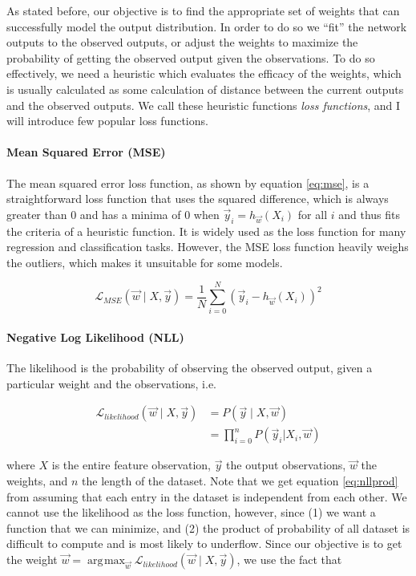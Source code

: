 \documentclass[12pt,a4paper,]{report}
\DeclareMathOperator*{\argmax}{arg\!\max}
\begin{document}
As stated before, our objective is to find the appropriate set of
weights that can successfully model the output distribution. In order to
do so we ``fit'' the network outputs to the observed outputs, or adjust
the weights to maximize the probability of getting the observed output
given the observations. To do so effectively, we need a heuristic which
evaluates the efficacy of the weights, which is usually calculated as
some calculation of distance between the current outputs and the
observed outputs. We call these heuristic functions \emph{loss
functions}, and I will introduce few popular loss functions.

\paragraph{Mean Squared Error (MSE)}

The mean squared error loss function, as shown by equation \ref{eq:mse},
is a straightforward loss function that uses the squared difference,
which is always greater than 0 and has a minima of 0 when
\(\vec{y}_i = h_{\vec{w}}(X_i)\) for all \(i\) and thus fits the
criteria of a heuristic function. It is widely used as the loss function
for many regression and classification tasks. However, the MSE loss
function heavily weighs the outliers, which makes it unsuitable for some
models.

\begin{equation}
    \mathcal{L}_{MSE}(\vec{w} \mid X, \vec{y}) = \frac{1}{N} \sum_{i = 0}^{N} (\vec{y}_i - h_{\vec{w}}(X_i))^2 \label{eq:mse}
\end{equation}

\paragraph{Negative Log Likelihood (NLL)}

The likelihood is the probability of observing the observed output,
given a particular weight and the observations, i.e.

\begin{align}
    \mathcal{L}_{likelihood}(\vec{w} \mid X, \vec{y}) &= P(\vec{y} \mid X, \vec{w}) \\
    &= \prod_{i = 0}^{n} P(\vec{y}_i |  X_i, \vec{w}) \label{eq:nllprod}
\end{align}

where \(X\) is the entire feature observation, \(\vec{y}\) the output
observations, \(\vec{w}\) the weights, and \(n\) the length of the
dataset. Note that we get equation \ref{eq:nllprod} from assuming that
each entry in the dataset is independent from each other. We cannot use
the likelihood as the loss function, however, since (1) we want a
function that we can minimize, and (2) the product of probability of all
dataset is difficult to compute and is most likely to underflow. Since
our objective is to get the weight
\(\vec{w} = \displaystyle \argmax_{\vec{w}} \mathcal{L}_{likelihood}(\vec{w} \mid X, \vec{y})\),
we use the fact that
\end{document}
